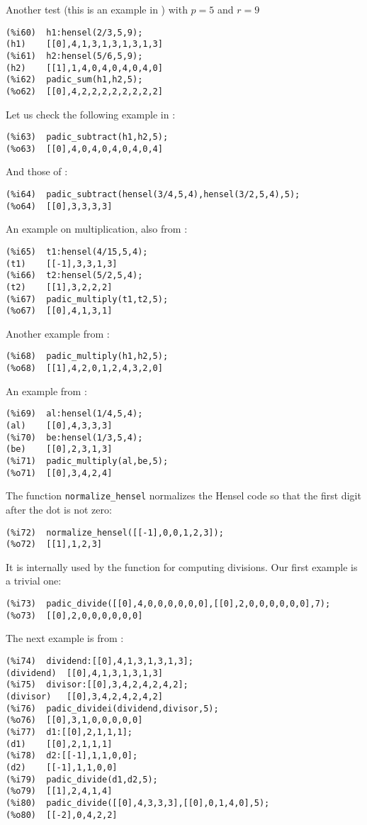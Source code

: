 \documentclass[fleqn]{cas-sc}
\begin{document}
Another test (this is an example in \cite{2}) with $p=5$ and $r=9$
\begin{verbatim}
(%i60)	h1:hensel(2/3,5,9);
(h1)	[[0],4,1,3,1,3,1,3,1,3]
(%i61)	h2:hensel(5/6,5,9);
(h2)	[[1],1,4,0,4,0,4,0,4,0]
(%i62)	padic_sum(h1,h2,5);
(%o62)	[[0],4,2,2,2,2,2,2,2,2]
\end{verbatim}

Let us check the following example in \cite{2}:
\begin{verbatim}
(%i63)	padic_subtract(h1,h2,5);
(%o63)	[[0],4,0,4,0,4,0,4,0,4]
\end{verbatim}

And those of \cite{3}:
\begin{verbatim}
(%i64)	padic_subtract(hensel(3/4,5,4),hensel(3/2,5,4),5);
(%o64)	[[0],3,3,3,3]
\end{verbatim}

An example on multiplication, also from \cite{3}:
\begin{verbatim}
(%i65)	t1:hensel(4/15,5,4);
(t1)	[[-1],3,3,1,3]
(%i66)	t2:hensel(5/2,5,4);
(t2)	[[1],3,2,2,2]
(%i67)	padic_multiply(t1,t2,5);
(%o67)	[[0],4,1,3,1]
\end{verbatim}

Another example from \cite{2}:
\begin{verbatim}
(%i68)	padic_multiply(h1,h2,5);
(%o68)	[[1],4,2,0,1,2,4,3,2,0]
\end{verbatim}

An example from \cite{4}:
\begin{verbatim}
(%i69)	al:hensel(1/4,5,4);
(al)	[[0],4,3,3,3]
(%i70)	be:hensel(1/3,5,4);
(be)	[[0],2,3,1,3]
(%i71)	padic_multiply(al,be,5);
(%o71)	[[0],3,4,2,4]
\end{verbatim}

The function \texttt{normalize\_hensel} normalizes the Hensel code so that the
first digit after the dot is not zero:
\begin{verbatim}
(%i72)	normalize_hensel([[-1],0,0,1,2,3]);
(%o72)	[[1],1,2,3]
\end{verbatim}
It is internally used by the function for computing divisions. Our first
example is a trivial one:
\begin{verbatim}
(%i73)	padic_divide([[0],4,0,0,0,0,0,0],[[0],2,0,0,0,0,0,0],7);
(%o73)	[[0],2,0,0,0,0,0,0]
\end{verbatim}

The next example is from \cite{2}:
\begin{verbatim}
(%i74)	dividend:[[0],4,1,3,1,3,1,3];
(dividend)	[[0],4,1,3,1,3,1,3]
(%i75)	divisor:[[0],3,4,2,4,2,4,2];
(divisor)	[[0],3,4,2,4,2,4,2]
(%i76)	padic_dividei(dividend,divisor,5);
(%o76)	[[0],3,1,0,0,0,0,0]
(%i77)	d1:[[0],2,1,1,1];
(d1)	[[0],2,1,1,1]
(%i78)	d2:[[-1],1,1,0,0];
(d2)	[[-1],1,1,0,0]
(%i79)	padic_divide(d1,d2,5);
(%o79)	[[1],2,4,1,4]
(%i80)	padic_divide([[0],4,3,3,3],[[0],0,1,4,0],5);
(%o80)	[[-2],0,4,2,2]
\end{verbatim}
\end{document}
